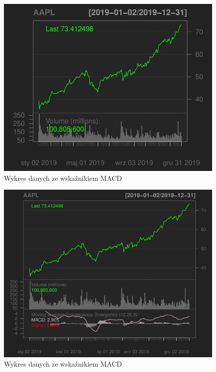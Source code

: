 \documentclass[12pt, a4paper]{article}\usepackage[]{graphicx}\usepackage[]{color}
\makeatletter
\def\maxwidth{ %
  \ifdim\Gin@nat@width>\linewidth
    \linewidth
  \else
    \Gin@nat@width
  \fi
}
\newenvironment{knitrout}{}{} %
\makeatother
\begin{document}
\begin{knitrout}
\color{fgcolor}\begin{figure}[H]

{\centering \includegraphics[width=\maxwidth]{figure/unnamed-chunk-3-1} 

}

\caption[Wykres danych ze wskaźnikiem MACD]{Wykres danych ze wskaźnikiem MACD}\label{fig:unnamed-chunk-3-1}
\end{figure}

\begin{figure}[H]

{\centering \includegraphics[width=\maxwidth]{figure/unnamed-chunk-3-2} 

}

\caption[Wykres danych ze wskaźnikiem MACD]{Wykres danych ze wskaźnikiem MACD}\label{fig:unnamed-chunk-3-2}
\end{figure}

\end{knitrout}
\end{document}
